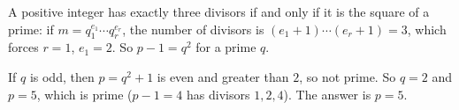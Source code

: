 A positive integer has exactly three divisors if and only if it is the square of a prime: if $m=q_1^{e_1}\cdots q_r^{e_r}$, the number of divisors is $(e_1+1)\cdots(e_r+1)=3$, which forces $r=1$, $e_1=2$. So $p-1=q^2$ for a prime $q$.

If $q$ is odd, then $p=q^2+1$ is even and greater than $2$, so not prime. So $q=2$ and $p=5$, which is prime ($p-1=4$ has divisors $1,2,4$). The answer is $\boxed{p=5}$.
